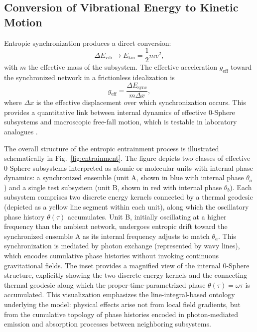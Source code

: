\documentclass[
 reprint,
 amsmath,amssymb,
 aps,
 prb,
]{revtex4-2}
\numberwithin{equation}{section}
\begin{document}
\subsection{Conversion of Vibrational Energy to Kinetic Motion}

Entropic synchronization produces a direct conversion:
\begin{equation}
\Delta E_\text{vib} \rightarrow E_\text{kin} = \frac{1}{2} m v^2,
\label{eq:energy_conversion}
\end{equation}
with $m$ the effective mass of the subsystem. The effective acceleration $g_\text{eff}$ toward the synchronized network in a frictionless idealization is
\begin{equation}
g_\text{eff} = \frac{\Delta E_\text{sync}}{m \Delta x},
\label{eq:effective_acceleration}
\end{equation}
where $\Delta x$ is the effective displacement over which synchronization occurs. This provides a quantitative link between internal dynamics of effective 0-Sphere subsystems and macroscopic free-fall motion, which is testable in laboratory analogues \cite{Leibfried2003,Bloch2008,Wineland1998}.

The overall structure of the entropic entrainment process is illustrated schematically in Fig.~\ref{fig:entrainment}. The figure depicts two classes of effective 0-Sphere subsystems interpreted as atomic or molecular units with internal phase dynamics: a synchronized ensemble (unit A, shown in blue with internal phase $\theta_a$) and a single test subsystem (unit B, shown in red with internal phase $\theta_b$). Each subsystem comprises two discrete energy kernels connected by a thermal geodesic (depicted as a yellow line segment within each unit), along which the oscillatory phase history $\theta(\tau)$ accumulates. Unit B, initially oscillating at a higher frequency than the ambient network, undergoes entropic drift toward the synchronized ensemble A as its internal frequency adjusts to match $\theta_a$. This synchronization is mediated by photon exchange (represented by wavy lines), which encodes cumulative phase histories without invoking continuous gravitational fields. The inset provides a magnified view of the internal 0-Sphere structure, explicitly showing the two discrete energy kernels and the connecting thermal geodesic along which the proper-time-parametrized phase $\theta(\tau) = \omega \tau$ is accumulated. This visualization emphasizes the line-integral-based ontology underlying the model: physical effects arise not from local field gradients, but from the cumulative topology of phase histories encoded in photon-mediated emission and absorption processes between neighboring subsystems.
\end{document}
